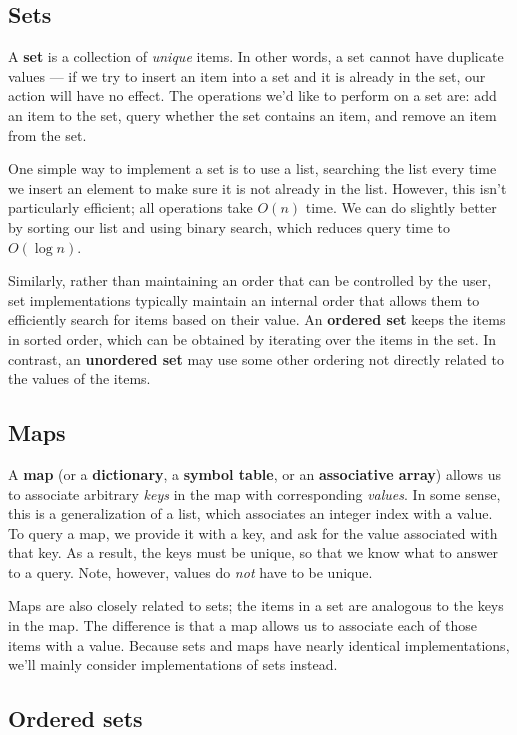 \subsection{Sets}
A \textbf{set} is a collection of \textit{unique} items. In other words, a set cannot have duplicate values --- if we try to insert an item into a set and it is already in the set, our action will have no effect. The operations we'd like to perform on a set are: add an item to the set, query whether the set contains an item, and remove an item from the set.

One simple way to implement a set is to use a list, searching the list every time we insert an element to make sure it is not already in the list. However, this isn't particularly efficient; all operations take $O(n)$ time. We can do slightly better by sorting our list and using binary search, which reduces query time to $O(\log n)$.

Similarly, rather than maintaining an order that can be controlled by the user, set implementations typically maintain an internal order that allows them to efficiently search for items based on their value. An \textbf{ordered set} keeps the items in sorted order, which can be obtained by iterating over the items in the set. In contrast, an \textbf{unordered set} may use some other ordering not directly related to the values of the items.


\subsection{Maps}

A \textbf{map} (or a \textbf{dictionary}, a \textbf{symbol table}, or an \textbf{associative array}) allows us to associate arbitrary \textit{keys} in the map with corresponding \textit{values}. In some sense, this is a generalization of a list, which associates an integer index with a value. To query a map, we provide it with a key, and ask for the value associated with that key. As a result, the keys must be unique, so that we know what to answer to a query. Note, however, values do \textit{not} have to be unique.

Maps are also closely related to sets; the items in a set are analogous to the keys in the map. The difference is that a map allows us to associate each of those items with a value. Because sets and maps have nearly identical implementations, we'll mainly consider implementations of sets instead.


\subsection{Ordered sets}

